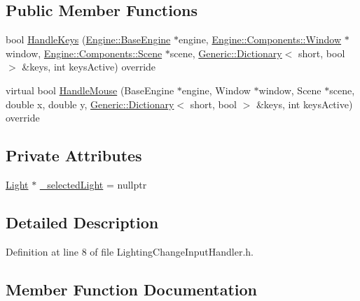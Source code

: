 \subsection*{Public Member Functions}
\begin{DoxyCompactItemize}
\item 
bool \mbox{\hyperlink{classApplication_1_1Input_1_1Handlers_1_1LightingChangeInputHandler_a5017479d6edea9d6bedf3093cf49cb24}{Handle\+Keys}} (\mbox{\hyperlink{classEngine_1_1BaseEngine}{Engine\+::\+Base\+Engine}} $\ast$engine, \mbox{\hyperlink{classEngine_1_1Components_1_1Window}{Engine\+::\+Components\+::\+Window}} $\ast$window, \mbox{\hyperlink{classEngine_1_1Components_1_1Scene}{Engine\+::\+Components\+::\+Scene}} $\ast$scene, \mbox{\hyperlink{classGeneric_1_1Dictionary}{Generic\+::\+Dictionary}}$<$ short, bool $>$ \&keys, int keys\+Active) override
\item 
virtual bool \mbox{\hyperlink{classEngine_1_1Components_1_1BaseInputHandler_a8b50fb66d01573616072d708075a721e}{Handle\+Mouse}} (Base\+Engine $\ast$engine, Window $\ast$window, Scene $\ast$scene, double x, double y, \mbox{\hyperlink{classGeneric_1_1Dictionary}{Generic\+::\+Dictionary}}$<$ short, bool $>$ \&keys, int keys\+Active) override
\end{DoxyCompactItemize}
\subsection*{Private Attributes}
\begin{DoxyCompactItemize}
\item 
\mbox{\hyperlink{classLight}{Light}} $\ast$ \mbox{\hyperlink{classApplication_1_1Input_1_1Handlers_1_1LightingChangeInputHandler_a9d2d27b234fd09b3add304963534b719}{\+\_\+selected\+Light}} = nullptr
\end{DoxyCompactItemize}


\subsection{Detailed Description}


Definition at line 8 of file Lighting\+Change\+Input\+Handler.\+h.



\subsection{Member Function Documentation}
\mbox{\label{classApplication_1_1Input_1_1Handlers_1_1LightingChangeInputHandler_a5017479d6edea9d6bedf3093cf49cb24}} 
